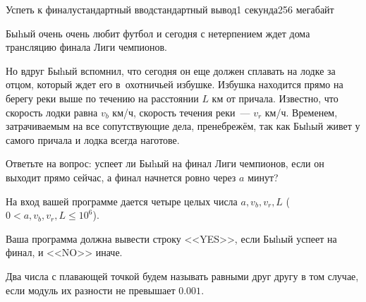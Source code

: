 \begin{problem}{Успеть к финалу}{стандартный ввод}{стандартный вывод}{1 секунда}{256 мегабайт}

Быhый очень очень любит футбол и сегодня с нетерпением ждет дома трансляцию финала Лиги чемпионов. 

Но вдруг Быhый вспомнил, что сегодня он еще должен сплавать на лодке за отцом, который ждет его в~охотничьей избушке. Избушка находится прямо на берегу реки выше по течению на расстоянии $L$ км от причала. Известно, что скорость лодки равна $v_b$ км/ч, скорость течения реки~--- $v_r$ км/ч. Временем, затрачиваемым на все сопутствующие дела, пренебрежём, так как Быhый живет у самого причала и лодка всегда наготове. 

Ответьте на вопрос: успеет ли Быhый на финал Лиги чемпионов, если он выходит прямо сейчас, а финал начнется ровно через $a$ минут?

\InputFile
На вход вашей программе дается четыре целых числа $a, v_b, v_r, L$ ($0 < a, v_b, v_r, L\leq 10^6$).

\OutputFile
Ваша программа должна вывести строку <<YES>>, если Быhый успеет на финал, и <<NO>> иначе.

\Examples

\begin{example}
%
%
\end{example}

\Note
Два числа с плавающей точкой будем называть равными друг другу в том случае, если модуль их разности не превышает $0.001$.

\end{problem}

